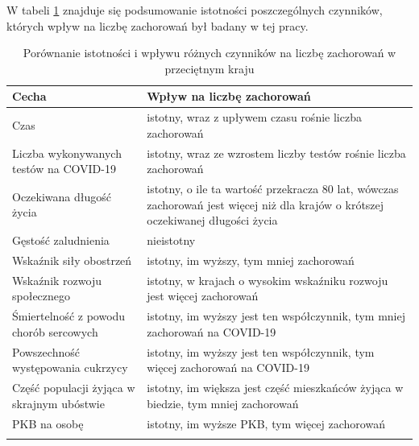 \documentclass[12pt]{mwbk}
\theoremstyle{plain}
\theoremstyle{definition}
\theoremstyle{remark}
\newcommand\zrodlo[1]{\par\vspace{-3mm}{\small\textit{Źródło: }#1 }}
\begin{document}
W tabeli \ref{tab:istotnosc} znajduje się podsumowanie istotności poszczególnych czynników, których wpływ na liczbę zachorowań był badany w tej pracy.


\begin{longtable}{| p{} | p{} |}
	\hline
	Cecha & Wpływ na liczbę zachorowań \\ \hline 
	Czas & istotny, wraz z upływem czasu rośnie liczba zachorowań \\ \hline
	Liczba wykonywanych testów na COVID-19 & istotny, wraz ze wzrostem liczby testów rośnie liczba zachorowań \\ \hline
	Oczekiwana długość życia & istotny, o ile ta wartość przekracza 80 lat, wówczas zachorowań jest więcej niż dla krajów o krótszej oczekiwanej długości życia \\ \hline 
	Gęstość zaludnienia & nieistotny \\ \hline
	Wskaźnik siły obostrzeń & istotny, im wyższy, tym mniej zachorowań \\ \hline
	Wskaźnik rozwoju społecznego & istotny, w krajach o wysokim wskaźniku rozwoju jest więcej zachorowań \\ \hline
	Śmiertelność z powodu chorób sercowych & istotny, im wyższy jest ten współczynnik, tym mniej zachorowań na COVID-19 \\ \hline
	Powszechność występowania cukrzycy & istotny, im wyższy jest ten współczynnik, tym więcej zachorowań na COVID-19 \\ \hline
	Część populacji żyjąca w skrajnym ubóstwie & istotny, im większa jest część mieszkańców żyjąca w biedzie, tym mniej zachorowań \\ \hline
	PKB na osobę & istotny, im wyższe PKB, tym więcej zachorowań \\ \hline
	\caption{Porównanie istotności i wpływu różnych czynników na liczbę zachorowań w przeciętnym kraju}
	
	\label{tab:istotnosc}
	
	\end{longtable}
\begin{center}\zrodlo{Opracowanie własne}
	\end{center}
\newpage
\end{document}
